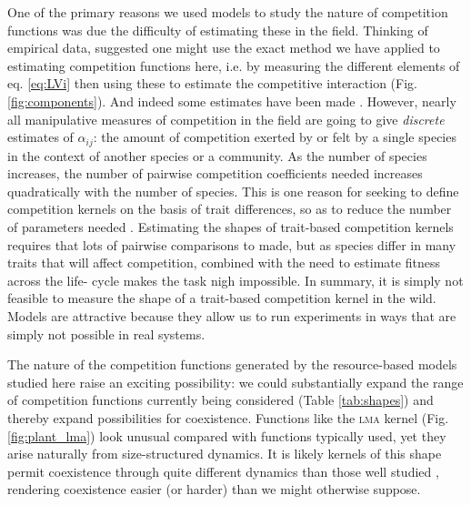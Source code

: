 \documentclass[a4paper,11pt]{article}
\begin{document}
One of the primary reasons we used models to study the nature of
competition functions was due the difficulty of estimating these in
the field.
Thinking of empirical data, \citet{Ricklefs-1973} suggested one might use
the exact method we have
applied to estimating competition functions here, i.e. by measuring the
different elements of eq. \ref{eq:LVi} then using these to estimate
the competitive interaction (Fig. \ref{fig:components}).
And indeed some estimates have been made \citep{Ricklefs-1973,
  Kraft-2015}.
%
However, nearly all manipulative measures of competition in the field
are going to give \emph{discrete} estimates of $\alpha_{ij}$: the
amount of competition exerted by or felt by a single species in the
context of another species or a community. As the number of species
increases, the number of pairwise competition coefficients needed
increases quadratically with the number of species. This is one reason
for seeking to define competition kernels on the basis of trait
differences, so as to reduce the number of parameters needed
\citep{Kraft-2015}. Estimating the shapes of trait-based competition
kernels requires that lots of pairwise comparisons to made, but as
species differ in many traits that will affect competition, combined
with the need to estimate fitness across the life- cycle makes the
task nigh impossible. In summary, it is simply not feasible to measure the
shape of a trait-based competition kernel in the wild.
Models are attractive because they allow us to
run experiments in ways that are simply not possible in real systems.

The nature of the competition functions generated by the
resource-based models studied here raise an exciting possibility: we
could substantially expand the range of competition functions
currently being considered (Table \ref{tab:shapes}) and thereby expand
possibilities for coexistence. Functions like the \textsc {lma} kernel
(Fig. \ref{fig:plant_lma}) look unusual compared with functions
typically used, yet they arise naturally from size-structured
dynamics.  It is likely kernels of this shape permit coexistence
through quite different dynamics than those well studied
\citep[e.g.][]{Leimar-2013}, rendering coexistence easier (or harder)
than we might otherwise suppose.
\end{document}
